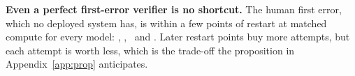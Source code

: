 \textbf{Even a perfect first-error verifier is no shortcut.} The human first error, which no
deployed system has, is within a few points of restart at matched compute for every model:
\QwenSmallPolHumanFourDiff, \QwenTwoPolHumanFourDiff, \QwenMathPolHumanFourDiff\ and
\LlamaPolHumanFourDiff. Later restart points buy more attempts, but each attempt is worth less,
which is the trade-off the proposition in Appendix~\ref{app:prop} anticipates.
